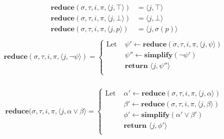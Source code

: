 \documentclass[10pt,a4paper]{article}
\newcommand{\rp}[2]{\ensuremath{\langle #1, #2 \rangle}}
\begin{document}

\begin{align*}
\mathbf{reduce}(\sigma,\tau, i,\pi,\rp{j}{\top}) &= \rp{j}{\top} \\
\mathbf{reduce}(\sigma,\tau, i,\pi,\rp{j}{\bot}) &= \rp{j}{\bot} \\
\mathbf{reduce}(\sigma,\tau, i,\pi,\rp{j}{p}) &= \rp{j}{\sigma(p)} \\
\end{align*}
\begin{align*}
\mathbf{reduce}(\sigma,\tau, i,\pi,\rp{j}{\neg \psi}) = \left\{
\begin{aligned}
\text{Let } &\psi' \leftarrow \mathbf{reduce}(\sigma, \tau, i, \pi, \rp{j}{\psi}) \\
&\psi'' \leftarrow \mathbf{simplify}(\neg \psi') \\
&\textbf{return } \rp{j}{\psi''} \\
\end{aligned} \right. \\
\end{align*}

\begin{align*}
\mathbf{reduce}(\sigma,\tau, i,\pi,\rp{j}{\alpha \vee \beta} = \left\{
\begin{aligned}
\text{Let } &\alpha' \leftarrow \mathbf{reduce}(\sigma, \tau, i, \pi, \rp{j}{\alpha}) \\
&\beta' \leftarrow \mathbf{reduce}(\sigma, \tau, i, \pi, \rp{j}{\beta}) \\
&\phi' \leftarrow \mathbf{simplify}(\alpha' \vee \beta') \\
&\textbf{return } \rp{j}{\phi'} \\
\end{aligned} \right. \\
\end{align*}
\end{document}
